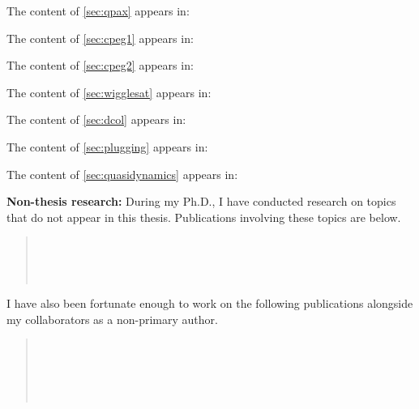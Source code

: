 \noindent The content of \cref{sec:qpax} appears in:
\vspace{5mm}

\noindent The content of \cref{sec:cpeg1} appears in:
\vspace{5mm}

\noindent The content of \cref{sec:cpeg2} appears in:
\vspace{5mm}

\noindent The content of \cref{sec:wigglesat} appears in:
\vspace{5mm}

\noindent The content of \cref{sec:dcol} appears in:
\vspace{5mm}

\noindent The content of \cref{sec:plugging} appears in:
\vspace{5mm}

\noindent The content of \cref{sec:quasidynamics} appears in:
\vspace{5mm}

\noindent
\textbf{Non-thesis research:}
During my Ph.D., I have conducted research on topics that do not appear in this thesis. Publications involving these topics are below. 

\begin{leftbar}
\begin{quote}%
  \citep{tracy2020}  \\[5mm]
  \citep{tracy2021}  \\[5mm]
  \citep{tracy2022f}  \\[5mm]
  \citep{tracy2022}  
\end{quote}
\end{leftbar}

\vspace{7mm}
\noindent
I have also been fortunate enough to work on the following publications alongside my collaborators as a non-primary author.

\begin{leftbar}
\begin{quote}%
   \\[5mm]
   \\[5mm]
   \\[5mm]
   \\[5mm]
\end{quote}
\end{leftbar}



